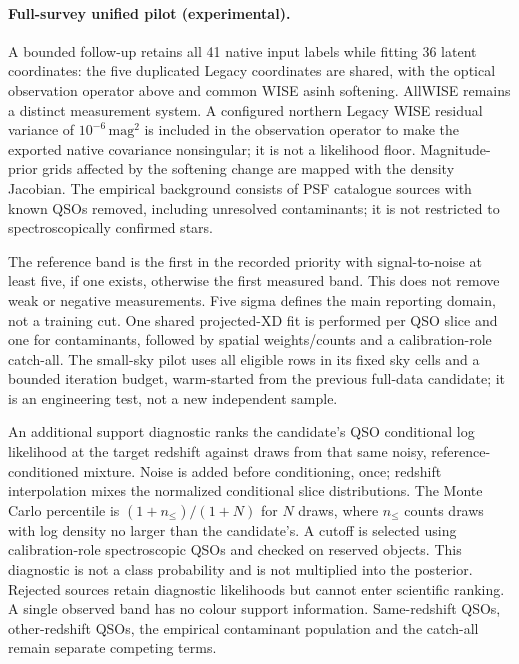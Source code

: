 \documentclass[11pt,a4paper]{article}
\begin{document}
\paragraph{Full-survey unified pilot (experimental).}
A bounded follow-up retains all 41 native input labels while fitting 36 latent
coordinates: the five duplicated Legacy coordinates are shared, with the
optical observation operator above and common WISE asinh softening. AllWISE
remains a distinct measurement system. A configured northern Legacy WISE
residual variance of $10^{-6}\,\mathrm{mag}^2$ is included in the observation
operator to make the exported native covariance nonsingular; it is not a
likelihood floor. Magnitude-prior grids affected by the softening change are
mapped with the density Jacobian. The empirical background consists of PSF
catalogue sources with known QSOs removed, including unresolved contaminants;
it is not restricted to spectroscopically confirmed stars.

The reference band is the first in the recorded priority with signal-to-noise
at least five, if one exists, otherwise the first measured band. This does not
remove weak or negative measurements. Five sigma defines the main reporting
domain, not a training cut. One shared projected-XD fit is performed per QSO
slice and one for contaminants, followed by spatial weights/counts and a
calibration-role catch-all. The small-sky pilot uses all eligible rows in its
fixed sky cells and a bounded iteration budget, warm-started from the previous
full-data candidate; it is an engineering test, not a new independent sample.

An additional support diagnostic ranks the candidate's QSO conditional log
likelihood at the target redshift against draws from that same noisy,
reference-conditioned mixture. Noise is added before conditioning, once;
redshift interpolation mixes the normalized conditional slice distributions.
The Monte Carlo percentile is $(1+n_{\leq})/(1+N)$ for $N$ draws, where
$n_{\leq}$ counts draws with log density no larger than the candidate's.
A cutoff is selected using calibration-role spectroscopic QSOs and checked
on reserved objects. This diagnostic is not a class probability and is not
multiplied into the posterior. Rejected sources retain diagnostic likelihoods
but cannot enter scientific ranking. A single observed band has no colour
support information. Same-redshift QSOs, other-redshift QSOs, the empirical
contaminant population and the catch-all remain separate competing terms.
\end{document}
